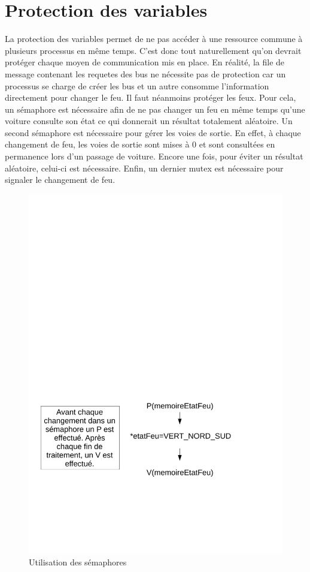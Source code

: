 \section{Protection des variables}
La protection des variables permet de ne pas accéder à une ressource commune à plusieurs processus en même temps. C'est donc tout naturellement qu'on devrait protéger chaque moyen de communication mis en place. En réalité, la file de message contenant les requetes des bus ne nécessite pas de protection car un processus se charge de créer les bus et un autre consomme l'information directement pour changer le feu. Il faut néanmoins protéger les feux. Pour cela, un sémaphore est nécessaire afin de ne pas changer un feu en même temps qu'une voiture consulte son état ce qui donnerait un résultat totalement aléatoire. Un second sémaphore est nécessaire pour gérer les voies de sortie. En effet, à chaque changement de feu, les voies de sortie sont mises à 0 et sont consultées en permanence lors d'un passage de voiture. Encore une fois, pour éviter un résultat aléatoire, celui-ci est nécessaire. Enfin, un dernier mutex est nécessaire pour signaler le changement de feu.
\newpage
\begin{figure}[htb!]
\centering
\includegraphics[scale=0.5]{graphe2LO41.pdf}

\caption{Utilisation des sémaphores}
\end{figure}
